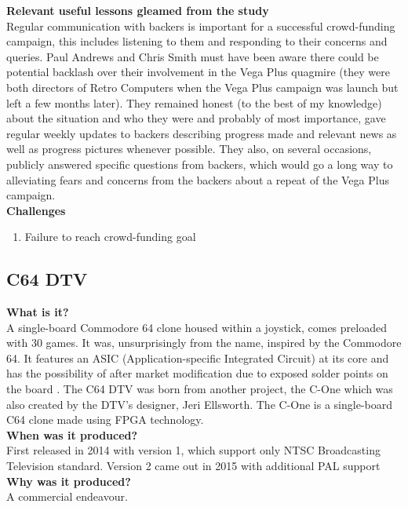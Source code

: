 \textbf{Relevant useful lessons gleamed from the study}\\
Regular communication with backers is important for a successful crowd-funding campaign, this includes listening to them and responding to their concerns and queries. Paul Andrews and Chris Smith must have been aware there could be potential backlash over their involvement in the Vega Plus quagmire (they were both directors of Retro Computers when the Vega Plus campaign was launch but left a few months later). They remained honest (to the best of my knowledge) about the situation and who they were and probably of most importance, gave regular weekly updates to backers describing progress made and relevant news as well as progress pictures whenever possible. They also, on several occasions, publicly answered specific questions from backers, which would go a long way to alleviating fears and concerns from the backers about a repeat of the Vega Plus campaign.  \\

\textbf{Challenges}
\begin{enumerate}
\item Failure to reach crowd-funding goal
\end{enumerate}


\subsection{C64 DTV}
\textbf{What is it?}\\
A single-board Commodore 64 clone housed within a joystick, comes preloaded with 30 games. It was, unsurprisingly from the name, inspired by the Commodore 64. It features an ASIC (Application-specific Integrated Circuit) at its core 
\cite{RN129} and has the possibility of after market modification due to exposed solder points on the board
\cite{RN126}. The C64 DTV was born from another project, the C-One which was also created by the DTV's designer, Jeri Ellsworth. The C-One is a single-board C64 clone made using FPGA technology.\\

\textbf{When was it produced?}\\
First released in 2014 with version 1, which support only NTSC Broadcasting Television standard. Version 2 came out in 2015 with additional PAL support\\

\textbf{Why was it produced?}\\
A commercial endeavour. \\

